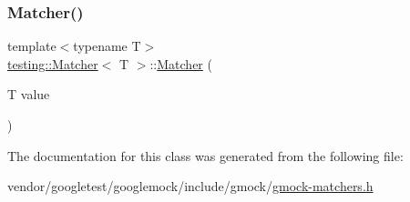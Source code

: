 \mbox{\label{classtesting_1_1_matcher_adc75e0bd47ffc75ba8a5f760372d0493}} 
\subsubsection{\texorpdfstring{Matcher()}{Matcher()}\hspace{0.1cm}{\footnotesize\ttfamily [3/3]}}
{\footnotesize\ttfamily template$<$typename T$>$ \\
\hyperlink{classtesting_1_1_matcher}{testing\+::\+Matcher}$<$ T $>$\+::\hyperlink{classtesting_1_1_matcher}{Matcher} (\begin{DoxyParamCaption}\item[{T}]{value }\end{DoxyParamCaption})}



The documentation for this class was generated from the following file\+:\begin{DoxyCompactItemize}
\item 
vendor/googletest/googlemock/include/gmock/\hyperlink{gmock-matchers_8h}{gmock-\/matchers.\+h}\end{DoxyCompactItemize}
